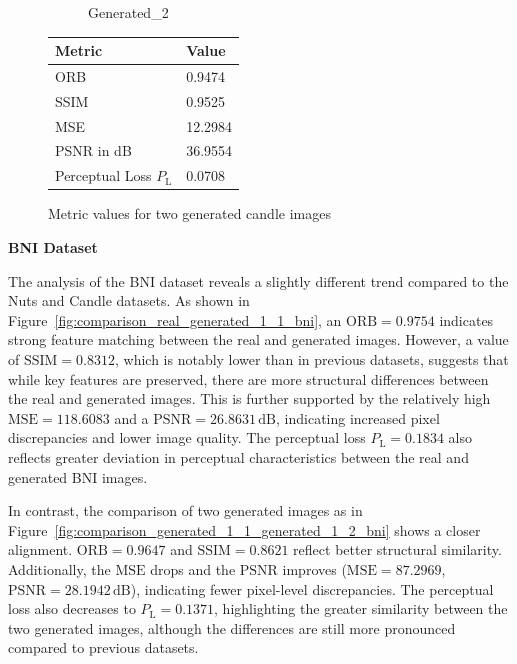 \documentclass[12pt,DIV14,BCOR12mm,a4paper,footinclude=false,headinclude,parskip=half-,twoside,openright,cleardoublepage=empty,toc=index,bibliography=totoc,listof=totoc]{scrreprt}
\numberwithin{equation}{chapter}
\begin{document}
\begin{figure}
\begin{minipage}[H]{\linewidth}
\begin{minipage}[H]{0.5\linewidth}
\begin{subfigure}[t]{0.48\linewidth}
                \caption{Generated\_2}
            \end{subfigure}
        \end{minipage}%
        \hfill
        \begin{minipage}[H]{0.5\linewidth} %
            \centering
            \small
            \begin{tabular}{p{3cm} p{2cm}}
                \toprule
                \textbf{Metric} & \textbf{Value} \\
                \midrule
                ORB             & 0.9474        \\
                SSIM            & 0.9525        \\
                MSE             & 12.2984       \\
                PSNR in dB      & 36.9554       \\
                Perceptual Loss \( P_{\text{L}} \) & 0.0708        \\
                \bottomrule
            \end{tabular}
        \end{minipage}%
        \caption{Metric values for two generated candle images}
        \label{fig:comparison_generated_1_1_generated_1_2_candle}
    \end{minipage}
\end{figure}


\textbf{BNI Dataset}

The analysis of the BNI dataset reveals a slightly different trend compared to the Nuts and Candle datasets. As shown in Figure~\ref{fig:comparison_real_generated_1_1_bni}, an $\text{ORB} = 0.9754$ indicates strong feature matching between the real and generated images. However, a value of $\text{SSIM} = 0.8312$, which is notably lower than in previous datasets, suggests that while key features are preserved, there are more structural differences between the real and generated images. This is further supported by the relatively high $\text{MSE} = 118.6083$ and a $\text{PSNR} = 26.8631\, \mathrm{dB}$, indicating increased pixel discrepancies and lower image quality. The perceptual loss $P_{\text{L}} = 0.1834$ also reflects greater deviation in perceptual characteristics between the real and generated BNI images.

In contrast, the comparison of two generated images as in Figure~\ref{fig:comparison_generated_1_1_generated_1_2_bni} shows a closer alignment. $\text{ORB} = 0.9647$ and $\text{SSIM} = 0.8621$ reflect better structural similarity. Additionally, the $\text{MSE}$ drops and the $\text{PSNR}$ improves ($\text{MSE} = 87.2969$, $\text{PSNR} = 28.1942\, \mathrm{dB}$), indicating fewer pixel-level discrepancies. The perceptual loss also decreases to $P_{\text{L}} = 0.1371$, highlighting the greater similarity between the two generated images, although the differences are still more pronounced compared to previous datasets.
\end{document}
